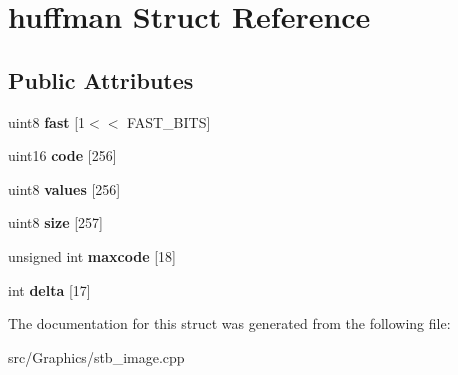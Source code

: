 \hypertarget{structhuffman}{\section{huffman Struct Reference}
\label{structhuffman}
}
\subsection*{Public Attributes}
\begin{DoxyCompactItemize}
\item 
\hypertarget{structhuffman_a9dbb29a8ed724a32f502d9595510ddc2}{uint8 {\bfseries fast} \mbox{[}1$<$$<$ F\+A\+S\+T\+\_\+\+B\+I\+T\+S\mbox{]}}\label{structhuffman_a9dbb29a8ed724a32f502d9595510ddc2}

\item 
\hypertarget{structhuffman_a9925018a95d5a2122cd732561fa0fa64}{uint16 {\bfseries code} \mbox{[}256\mbox{]}}\label{structhuffman_a9925018a95d5a2122cd732561fa0fa64}

\item 
\hypertarget{structhuffman_a313d78cf23f40b314c25681ff2a6224b}{uint8 {\bfseries values} \mbox{[}256\mbox{]}}\label{structhuffman_a313d78cf23f40b314c25681ff2a6224b}

\item 
\hypertarget{structhuffman_afdb0fbcf25aec42ba30b0d0e2453a057}{uint8 {\bfseries size} \mbox{[}257\mbox{]}}\label{structhuffman_afdb0fbcf25aec42ba30b0d0e2453a057}

\item 
\hypertarget{structhuffman_aeb78aca6c7377faaad8123566d54fc98}{unsigned int {\bfseries maxcode} \mbox{[}18\mbox{]}}\label{structhuffman_aeb78aca6c7377faaad8123566d54fc98}

\item 
\hypertarget{structhuffman_a04255e3e1c6de74d36a08a1aa4e9537d}{int {\bfseries delta} \mbox{[}17\mbox{]}}\label{structhuffman_a04255e3e1c6de74d36a08a1aa4e9537d}

\end{DoxyCompactItemize}


The documentation for this struct was generated from the following file\+:\begin{DoxyCompactItemize}
\item 
src/\+Graphics/stb\+\_\+image.\+cpp\end{DoxyCompactItemize}
